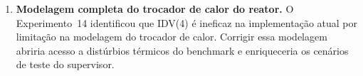 \begin{enumerate}
  \item \textbf{Modelagem completa do trocador de calor do reator.}
  O Experimento~14 identificou que IDV(4) é ineficaz na implementação atual por limitação na modelagem do trocador de calor. Corrigir essa modelagem abriria acesso a distúrbios térmicos do benchmark e enriqueceria os cenários de teste do supervisor.

\end{enumerate}
